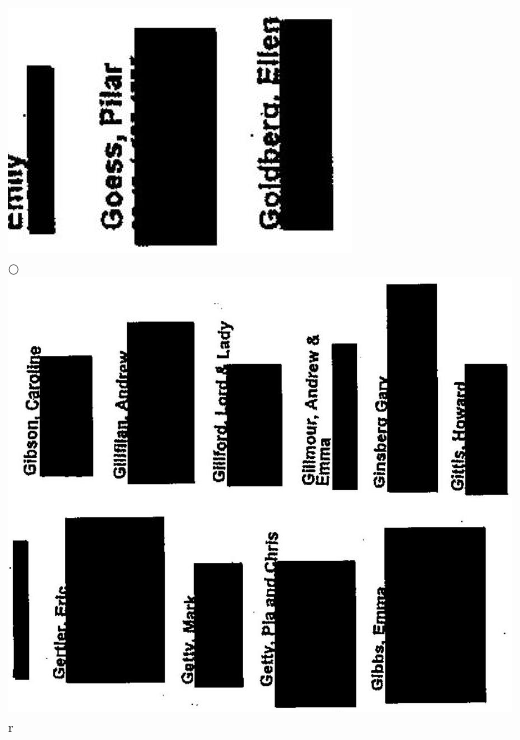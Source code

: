 \documentclass[10pt]{article}
\begin{document}
\includegraphics[max width=\textwidth, center]{2025_02_27_dd68c3d38de88f0516d9g-144}\\
\(\bigcirc\)\\
\includegraphics[max width=\textwidth, center]{2025_02_27_dd68c3d38de88f0516d9g-144(1)}\\
r\\
\end{document}
